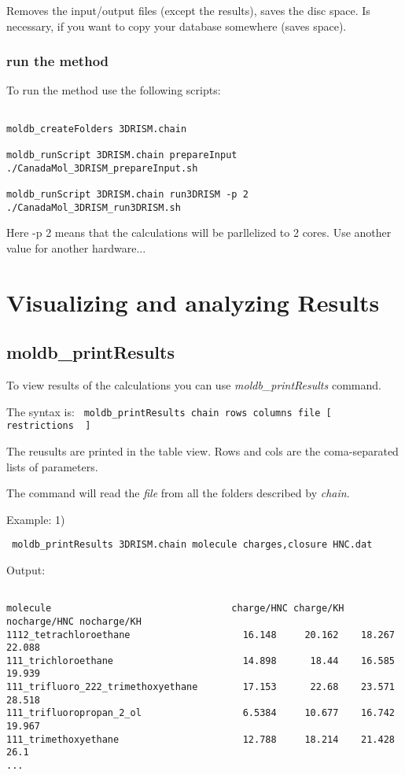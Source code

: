 \documentclass[12pt]{article}
\begin{document}
Removes the input/output files (except the results), saves the disc space.
Is necessary, if you want to copy your database somewhere (saves space).

\subsubsection{run the method}

To run the method use the following scripts:
\begin{verbatim}

moldb_createFolders 3DRISM.chain

moldb_runScript 3DRISM.chain prepareInput
./CanadaMol_3DRISM_prepareInput.sh 

moldb_runScript 3DRISM.chain run3DRISM -p 2
./CanadaMol_3DRISM_run3DRISM.sh 

\end{verbatim}

Here -p 2 means that the calculations will be parllelized to 2 cores. 
Use another value for another hardware... 

\section{Visualizing and analyzing Results}

\subsection{moldb\_printResults}

To view results of the calculations you can use \emph{moldb\_printResults} command. 

The syntax is:
\verb# moldb_printResults chain rows columns file [ restrictions  ]  #

The reusults are printed in the table view.
Rows and cols are the coma-separated lists of parameters.

The command will read the \emph{file} from all the folders described by \emph{chain}.

Example:
1)

\verb$ moldb_printResults 3DRISM.chain molecule charges,closure HNC.dat  $

Output: 

\begin{verbatim}

molecule                                charge/HNC charge/KH nocharge/HNC nocharge/KH 
1112_tetrachloroethane                    16.148     20.162    18.267       22.088    
111_trichloroethane                       14.898      18.44    16.585       19.939    
111_trifluoro_222_trimethoxyethane        17.153      22.68    23.571       28.518    
111_trifluoropropan_2_ol                  6.5384     10.677    16.742       19.967    
111_trimethoxyethane                      12.788     18.214    21.428       26.1
...
\end{verbatim}
\end{document}
